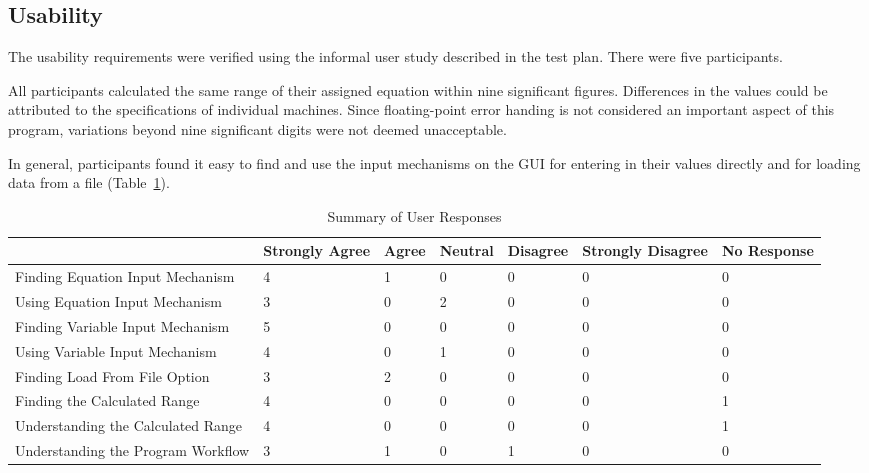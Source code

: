 \documentclass[12pt, titlepage]{article}
\begin{document}
\subsection{Usability}
The usability requirements were verified using the informal user study 
described in the test plan. There were five participants.

All participants calculated the same range of their assigned equation within 
nine significant figures. Differences in the values could be attributed to the 
specifications of individual machines. Since floating-point error handing is 
not considered an important aspect of this program, variations beyond nine 
significant digits were not deemed unacceptable.

In general, participants found it easy to find and use the input mechanisms on 
the GUI for entering in their values directly and for loading data from a file 
(Table~\ref{TblUserResponses}). 

\begin{center}
	\begin{longtable}{ | p{2.5cm} | p{1.5cm} | p{1.1cm} | m{1.5cm} | m{1.6cm} 
			|m{1.5cm} |m{1.5cm} |}
		\caption{Summary of User Responses} \\ \hline \label{TblUserResponses} 
		& \textbf{Strongly Agree} & \textbf{Agree} & \textbf{Neutral} & 
		\textbf{Disagree} & \textbf{Strongly Disagree} & \textbf{No Response}  
		\\ 
		\hline
		Finding Equation Input Mechanism & 4 & 1 & 0 & 0 & 0 & 0 \\ 
		\hline
		
		Using Equation Input Mechanism& 3 & 0 & 2 & 0 & 0 & 0 \\  \hline
		
		Finding Variable Input Mechanism& 5 & 0 & 0 & 0 & 0 & 0 \\  \hline
		
		Using Variable Input Mechanism& 4 & 0 & 1 & 0 & 0 & 0 \\  \hline
		
		Finding Load From File Option& 3 & 2 & 0 & 0 & 0 & 0 \\  \hline
		
		Finding the Calculated Range& 4 & 0 & 0 & 0 & 0 & 1 \\  \hline
		
		Understanding the Calculated Range& 4 & 0 & 0 & 0 & 0 & 1 \\  \hline
		
		Understanding the Program Workflow& 3 & 1 & 0 & 1 & 0 & 0 \\  \hline
	\end{longtable}
\end{center}
\end{document}

